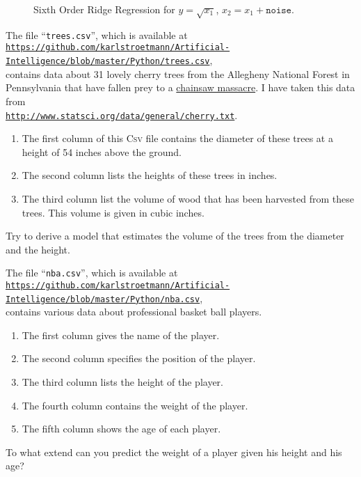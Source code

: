 \begin{figure}[!th]
\caption{Sixth Order Ridge Regression for $y = \sqrt{x_1}$, $x_2 = x_1 + \mathtt{noise}$.}
\label{fig:sqrt-6ridge.pdf}
\end{figure}

\pagebreak


\exercise
The file ``\texttt{trees.csv}'', which is available at
\\[0.2cm]
\hspace*{0.3cm}
\href{https://github.com/karlstroetmann/Artificial-Intelligence/blob/master/Python/trees.csv}{\texttt{https://github.com/karlstroetmann/Artificial-Intelligence/blob/master/Python/trees.csv}},
\\[0.2cm]
contains data about 31 lovely cherry trees from the Allegheny National Forest in Pennsylvania that have fallen
prey to a \href{https://en.wikipedia.org/wiki/The_Texas_Chain_Saw_Massacre}{chainsaw massacre}.  I have taken this data from
\\[0.2cm]
\hspace*{1.3cm}
\href{http://www.statsci.org/data/general/cherry.txt}{\texttt{http://www.statsci.org/data/general/cherry.txt}}.
\begin{enumerate}
\item The first column of this \textsc{Csv} file contains the diameter of these trees at a height of 54 inches above
      the ground.
\item The second column lists the heights of these trees in inches.
\item The third column list the volume of wood that has been harvested from these trees.  This volume is given
      in cubic inches.
\end{enumerate}
Try to derive a model that estimates the volume of the trees from the diameter and the height.
\eox
\pagebreak

\exercise
The file ``\texttt{nba.csv}'', which is available at
\\[0.2cm]
\hspace*{0.3cm}
\href{https://github.com/karlstroetmann/Artificial-Intelligence/blob/master/Python/nba.csv}{\texttt{https://github.com/karlstroetmann/Artificial-Intelligence/blob/master/Python/nba.csv}},
\\[0.2cm]
contains various data about professional basket ball players.
\begin{enumerate}
\item The first column gives the name of the player.
\item The second column specifies the position of the player.
\item The third column lists the height of the player.
\item The fourth column contains the weight of the player.
\item The fifth column shows the age of each player.
\end{enumerate}
To what extend can you predict the weight of a player given his height and his age?
\eox



